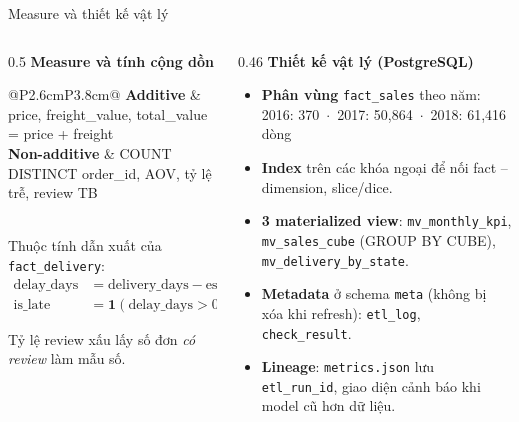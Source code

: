 \documentclass[aspectratio=169,10pt,xcolor=table]{beamer}
\begin{document}
\begin{frame}{Measure và thiết kế vật lý}
  \begin{columns}[T]
    \begin{column}{0.5\textwidth}
      \textbf{\small Measure và tính cộng dồn}\\[0.1cm]
      \footnotesize
      \begin{tabular}{@{}P{2.6cm}P{3.8cm}@{}}
        \toprule
        \textcolor{good}{\textbf{Additive}} & price, freight\_value, total\_value = price + freight\\
        \textcolor{bad}{\textbf{Non-additive}} & COUNT DISTINCT order\_id, AOV, tỷ lệ trễ, review TB\\
        \bottomrule
      \end{tabular}\\[0.2cm]
      Thuộc tính dẫn xuất của \texttt{fact\_delivery}:
      \begin{align*}
        \text{delay\_days} &= \text{delivery\_days} - \text{estimated\_days}\\
        \text{is\_late} &= \mathbf{1}(\text{delay\_days} > 0),\quad
        \text{is\_bad} = \mathbf{1}(\text{score} \le 2)
      \end{align*}
      {\scriptsize Tỷ lệ review xấu lấy số đơn \emph{có review} làm mẫu số.\par}
    \end{column}
    \begin{column}{0.46\textwidth}
      \textbf{\small Thiết kế vật lý (PostgreSQL)}
      \footnotesize
      \begin{itemize}
        \item \textbf{Phân vùng} \texttt{fact\_sales} theo năm:\\
          2016: 370 \,$\cdot$\, 2017: 50,864 \,$\cdot$\, 2018: 61,416 dòng
        \item \textbf{Index} trên các khóa ngoại để nối fact -- dimension, slice/dice.
        \item \textbf{3 materialized view}: \texttt{mv\_monthly\_kpi}, \texttt{mv\_sales\_cube} (GROUP BY CUBE), \texttt{mv\_delivery\_by\_state}.
        \item \textbf{Metadata} ở schema \texttt{meta} (không bị xóa khi refresh): \texttt{etl\_log}, \texttt{check\_result}.
        \item \textbf{Lineage}: \texttt{metrics.json} lưu \texttt{etl\_run\_id}, giao diện cảnh báo khi model cũ hơn dữ liệu.
      \end{itemize}
    \end{column}
  \end{columns}
\end{frame}
\end{document}
